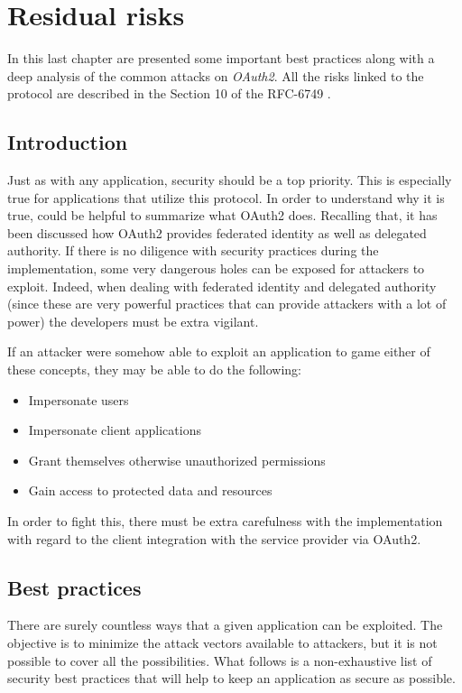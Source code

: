 \chapter{Residual risks}
In this last chapter are presented some important best practices along with a deep analysis of the common attacks on \textit{OAuth2}. All the risks linked to the protocol are described in the Section 10 of the RFC-6749 \cite{RFC6749}.

\minitoc

\section{Introduction}
Just as with any application, security should be a top priority. This is especially true for applications that utilize this protocol. In order to understand why it is true, could be helpful to summarize what OAuth2 does. Recalling that, it has been discussed how OAuth2 provides federated identity as well as delegated authority. If there is no diligence with security practices during the implementation, some very dangerous holes can be exposed for attackers to exploit.
Indeed, when dealing with federated identity and delegated authority (since these are very powerful practices that can provide attackers with a lot of power) the developers must be extra vigilant.

If an attacker were somehow able to exploit an application to game either of these concepts, they may be able to do the following:

\begin{itemize}
    \item Impersonate users
    \item Impersonate client applications
    \item Grant themselves otherwise unauthorized permissions
    \item Gain access to protected data and resources
\end{itemize}

In order to fight this, there must be extra carefulness with the implementation with regard to the client integration with the service provider via OAuth2. 

\section{Best practices}
There are surely countless ways that a given application can be exploited. The objective is to minimize the attack vectors available to attackers, but it is not possible to cover all the possibilities. What follows is a non-exhaustive list of security best practices that will help to keep an application as secure as possible. 

